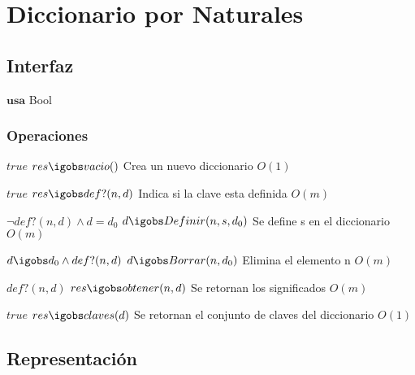 
\section{Diccionario por Naturales}

\subsection{Interfaz}

$\textbf{usa}$ Bool


\subsubsection*{Operaciones}


 {$true$}
 {$res \igobs vacio()$}
 {Crea un nuevo diccionario}
 {$O(1)$}
 {}
 
  {$true$}
  {$res \igobs def?(n,d)$}
  {Indica si la clave esta definida}
  {$O(m)$}
  {}

  {$\neg def?(n,d) \land d=d_0$}
  {$d \igobs Definir(n, s, d_0)$}
  {Se define s en el diccionario}
  {$O(m)$}
  {}

 {$d \igobs d_0 \land def?(n,d)$}
 {$d \igobs Borrar(n,d_0)$}
 {Elimina el elemento n}
 {$O(m)$}
 {}

 {$def?(n,d)$}
 {$res \igobs obtener(n,d)$}
 {Se retornan los significados}
 {$O(m)$}
 {}

 {$true$}
 {$res \igobs claves(d)$}
 {Se retornan el conjunto de claves del diccionario}
 {$O(1)$}
 {}

\subsection{Representación}

